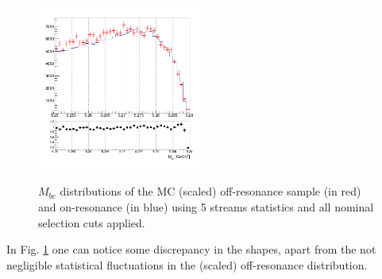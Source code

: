\begin{figure}[H]
{\includegraphics[width=0.5\textwidth]{04-chargedCorrBtoLambda/figs/stream01234_Mbc_continuumRescaling.png}}
\caption{$M_{bc}$ distributions of the MC (scaled) off-resonance sample (in red) and on-resonance (in blue) using 5 streams statistics and all nominal selection cuts applied.}
\label{fig:charged_corrLambdaC_Mbc_on_offResScaled}
\end{figure}

In Fig. \ref{fig:charged_corrLambdaC_Mbc_on_offResScaled} one can notice some discrepancy in the shapes, apart from the not negligible statistical fluctuations in the (scaled) off-resonance distribution.  



\newpage


